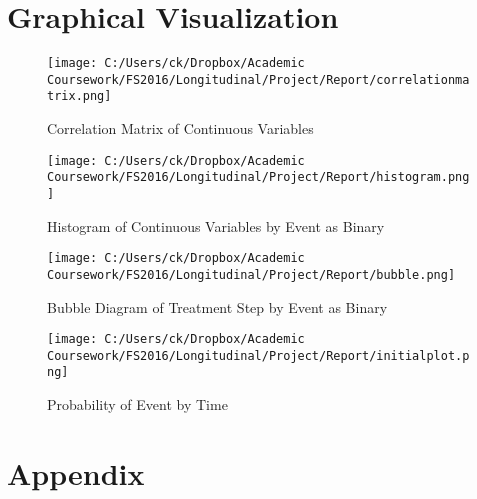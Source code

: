 \documentclass[10pt,a4paper,fleqn]{article}
\begin{document}
\section{Graphical Visualization}
\begin{figure}[!htbp]
\caption{Correlation Matrix of Continuous Variables}
\label{fig1}
\texttt{[image: C:/Users/ck/Dropbox/Academic Coursework/FS2016/Longitudinal/Project/Report/correlationmatrix.png]}
\end{figure}
\newpage
\begin{figure}[!htbp]
\caption{Histogram of Continuous Variables by Event as Binary}
\label{fig2}
\texttt{[image: C:/Users/ck/Dropbox/Academic Coursework/FS2016/Longitudinal/Project/Report/histogram.png]}
\end{figure}
\newpage
\begin{figure}[!htbp]
\caption{Bubble Diagram of Treatment Step by Event as Binary}
\label{fig3}
\texttt{[image: C:/Users/ck/Dropbox/Academic Coursework/FS2016/Longitudinal/Project/Report/bubble.png]}
\end{figure}
\newpage
\begin{figure}[!htbp]
\caption{Probability of Event by Time}
\label{fig4}
\texttt{[image: C:/Users/ck/Dropbox/Academic Coursework/FS2016/Longitudinal/Project/Report/initialplot.png]}
\end{figure}

\newpage


\section{Appendix}
\end{document}
